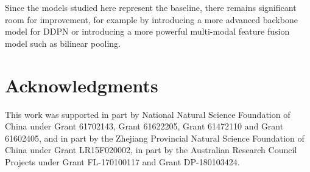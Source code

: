 \documentclass{article}
\begin{document}
Since the models studied here represent the baseline, there remains significant room for improvement, for example by introducing a more advanced backbone model for DDPN or introducing a more powerful multi-modal feature fusion model such as bilinear pooling.
\section*{Acknowledgments}
This work was supported in part by National Natural Science Foundation
of China under Grant 61702143, Grant 61622205, Grant 61472110 and Grant 61602405, and in part by the Zhejiang Provincial Natural Science Foundation of China under Grant LR15F020002, in part by the Australian Research Council Projects under Grant FL-170100117 and Grant DP-180103424.





\end{document}
